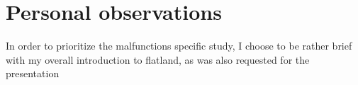 \section{Personal observations}
In order to prioritize the malfunctions specific study, I choose to be rather brief with my overall introduction to flatland, as was also requested for the presentation